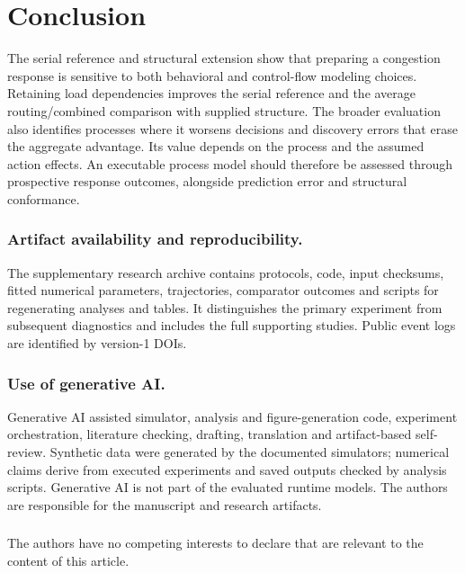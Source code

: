 \section{Conclusion}
The serial reference and structural extension show that preparing a congestion response is sensitive to both behavioral and control-flow modeling choices. Retaining load dependencies improves the serial reference and the average routing/combined comparison with supplied structure. The broader evaluation also identifies processes where it worsens decisions and discovery errors that erase the aggregate advantage. Its value depends on the process and the assumed action effects. An executable process model should therefore be assessed through prospective response outcomes, alongside prediction error and structural conformance.

\begin{credits}
\subsubsection{Artifact availability and reproducibility.}
The supplementary research archive contains protocols, code, input checksums, fitted numerical parameters, trajectories, comparator outcomes and scripts for regenerating analyses and tables. It distinguishes the primary experiment from subsequent diagnostics and includes the full supporting studies. Public event logs are identified by version-1 DOIs.
\subsubsection{Use of generative AI.}
Generative AI assisted simulator, analysis and figure-generation code, experiment orchestration, literature checking, drafting, translation and artifact-based self-review. Synthetic data were generated by the documented simulators; numerical claims derive from executed experiments and saved outputs checked by analysis scripts. Generative AI is not part of the evaluated runtime models. The authors are responsible for the manuscript and research artifacts.
\subsubsection{\discintname}
The authors have no competing interests to declare that are relevant to the content of this article.
\end{credits}
